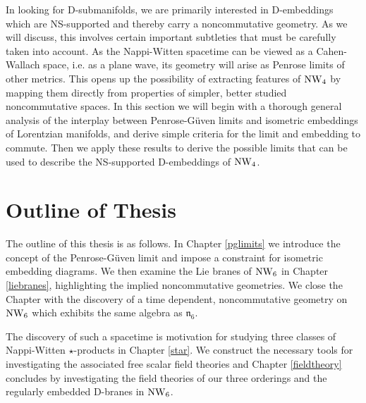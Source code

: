 In looking for D-submanifolds, we are primarily interested in D-embeddings which
are NS-supported and thereby carry a noncommutative geometry. As we will
discuss, this involves certain important subtleties that must be carefully taken
into account. As the Nappi-Witten spacetime can be viewed as a Cahen-Wallach
space, i.e. as a plane wave, its geometry will arise as Penrose limits of other
metrics. This opens up the possibility of extracting features of $\operatorname{NW}_4$ by
mapping them directly from properties of simpler, better studied noncommutative
spaces. In this section we will begin with a thorough general analysis of the
interplay between Penrose-G\"uven limits and isometric embeddings of Lorentzian
manifolds, and derive simple criteria for the limit and embedding to commute.
Then we apply these results to derive the possible limits that can be used to
describe the NS-supported D-embeddings of $\operatorname{NW}_4$.

\section{Outline of Thesis}
The outline of this thesis is as follows. In Chapter \ref{pglimits} we introduce
the concept of the Penrose-G\"{u}ven limit and impose a constraint for isometric
embedding diagrams. We then examine the Lie branes of $\operatorname{NW}_6$ in Chapter
\ref{liebranes}, highlighting the implied noncommutative geometries. We close
the Chapter with the discovery of a time dependent, noncommutative geometry on
$\operatorname{NW}_6$ which exhibits the same algebra as $\mathfrak{n}_6$.

The discovery of such a spacetime is motivation for studying three classes of
Nappi-Witten $\star$-products in Chapter \ref{star}. We construct the necessary
tools for investigating the associated free scalar field theories and Chapter
\ref{fieldtheory} concludes by investigating the field theories of our three
orderings and the regularly embedded D-branes in $\operatorname{NW}_6$.

